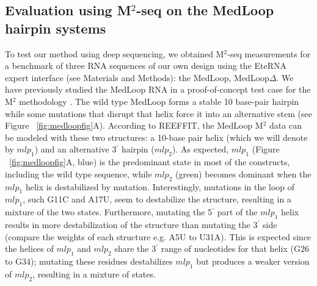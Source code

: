 \documentclass[12pt]{article}
\begin{document}
\subsection{Evaluation using M$^2$-seq on the MedLoop hairpin systems}
To test our method using deep sequencing, we obtained M$^2$-seq measurements for a benchmark of three RNA sequences of our own design using the EteRNA expert interface (see Materials and Methods): the MedLoop, MedLoop$\Delta$.
 We have previously studied the MedLoop RNA in a proof-of-concept test case for the M$^2$ methodology \cite{Kladwang2011}. 
The wild type MedLoop forms a stable 10 base-pair hairpin while some mutations that disrupt that helix force it into an alternative stem (see Figure ~\ref{fig:medloopfig}A). 
According to REEFFIT, the MedLoop M$^2$ data can be modeled with these two structures: a 10-base pair helix (which we will denote by $mlp_1$) and an alternative 3$^{\prime}$ hairpin ($mlp_2$). 
As expected, $mlp_1$ (Figure ~\ref{fig:medloopfig}A,  blue) is the predominant state in most of the constructs, including the wild type sequence, while $mlp_2$ (green) becomes dominant when the $mlp_1$ helix is destabilized by mutation. 
Interestingly, mutations in the loop of $mlp_1$, such G11C and A17U, seem to destabilize the structure, resulting in a mixture of the two states. 
Furthermore, mutating the 5$^{\prime}$ part of the $mlp_1$ helix results in more destabilization of the structure than mutating the 3$^{\prime}$ side (compare the weights of each structure e.g. A5U to U31A). 
This is expected since the helices of $mlp_1$ and $mlp_2$ share the 3$^{\prime}$ range of nucleotides for that helix (G26 to G34); mutating these residues destabilizes $mlp_1$ but produces a weaker version of $mlp_2$, resulting in a mixture of states. 
\end{document}
